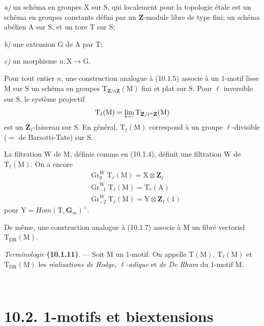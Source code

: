 \documentclass[11pt,leqno]{article}
\newcommand{\Page}[1]{\ifvmode\noindent\else\unskip\ \fi{\footnotesize\textcolor{gray}{[p.\,#1]}}\ \ignorespaces}
\begin{document}
\noindent \textit{a)} un schéma en groupes \(\mathrm{X}\) sur
\(\mathrm{S}\), qui localement pour la topologie étale est un schéma en
groupes constants défini par un \(\mathbf{Z}\)-module libre de type
fini; un schéma abélien \(\mathrm{A}\) sur \(\mathrm{S}\), et un tore
\(\mathrm{T}\) sur \(\mathrm{S}\);\par
\noindent \textit{b)} une extension \(\mathrm{G}\) de \(\mathrm{A}\)
par \(\mathrm{T}\);\par
\noindent \textit{c)} un morphisme \(u:\mathrm{X}\to\mathrm{G}\).

Pour tout entier \(n\), une construction analogue à (10.1.5) associe
à un 1-motif lisse \(\mathrm{M}\) sur \(\mathrm{S}\) un schéma en
groupes \(\mathrm{T}_{\mathbf{Z}/n\mathbf{Z}}(\mathrm{M})\) fini et
plat sur \(\mathrm{S}\). Pour \(\ell\) inversible sur \(\mathrm{S}\),
le système projectif
\[
\mathrm{T}_{\ell}(\mathrm{M})
=\varprojlim\mathrm{T}_{\mathbf{Z}/\ell^n\mathbf{Z}}(\mathrm{M})
\]
est un \(\mathbf{Z}_{\ell}\)-faisceau sur \(\mathrm{S}\). En général,
\(\mathrm{T}_{\ell}(\mathrm{M})\) correspond à un groupe
\(\ell\)-divisible (\(=\) de Barsotti-Tate) sur \(\mathrm{S}\).

La filtration \(\mathrm{W}\) de \(\mathrm{M}\), définie comme en
(10.1.4), définit une filtration \(\mathrm{W}\) de
\(\mathrm{T}_{\ell}(\mathrm{M})\). On a encore
\[
\begin{aligned}
&\operatorname{Gr}^{\mathrm{W}}_0\mathrm{T}_{\ell}(\mathrm{M})
  =\mathrm{X}\otimes\mathbf{Z}_{\ell}
\\
&\operatorname{Gr}^{\mathrm{W}}_{-1}\mathrm{T}_{\ell}(\mathrm{M})
  =\mathrm{T}_{\ell}(\mathrm{A})
\\
&\operatorname{Gr}^{\mathrm{W}}_{-2}\mathrm{T}_{\ell}(\mathrm{M})
  =\mathrm{Y}\otimes\mathbf{Z}_{\ell}(1)
\end{aligned}
\]
pour \(\mathrm{Y}=\mathit{Hom}(\mathrm{T},\mathbf{G}_m)^{\vee}\).

De même, une construction analogue à (10.1.7) associe à \(\mathrm{M}\)
un fibré vectoriel \(\mathrm{T}_{\mathrm{DR}}(\mathrm{M})\).

\textit{Terminologie} \textbf{(10.1.11)}. —
Soit \(\mathrm{M}\) un 1-motif. On appelle \(\mathrm{T}(\mathrm{M})\),
\(\mathrm{T}_{\ell}(\mathrm{M})\) et
\(\mathrm{T}_{\mathrm{DR}}(\mathrm{M})\) les
\textit{réalisations de Hodge, \(\ell\)-adique} et
\textit{de De Rham} du 1-motif \(\mathrm{M}\).

\Page{60}
\section*{10.2. 1-motifs et biextensions}
\end{document}
